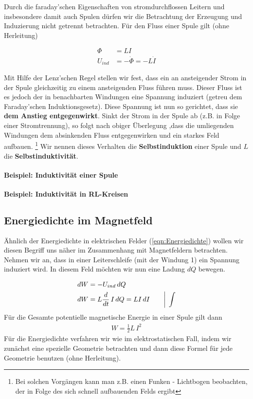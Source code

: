 Durch die faraday'schen Eigenschaften von stromdurchflossen Leitern und insbesondere damit auch Spulen dürfen wir die Betrachtung der Erzeugung und Induzierung nicht getrennt betrachten. 
Für den Fluss einer Spule gilt (ohne Herleitung) 


\begin{align} \label{eqn:FlussSpule}
\Phi &= L I \\
U_{ind} &= -\dot{\Phi} = - L \dot{I}
\end{align}

Mit Hilfe der Lenz'schen Regel stellen wir fest, dass ein an ansteigender Strom in der Spule gleichzeitig zu einem ansteigenden Fluss führen muss. 
Dieser Fluss ist es jedoch der in benachbarten Windungen eine Spannung induziert (getreu dem Faraday'schen Induktionsgesetz).
Diese Spannung ist nun so gerichtet, dass sie \textbf{dem Anstieg entgegenwirkt}.
Sinkt der Strom in der Spule ab (z.B. in Folge einer Stromtrennung), so folgt nach obiger Überlegung ,dass die umliegenden Windungen dem absinkenden Fluss entgegenwirken und ein starkes Feld aufbauen. \footnote{Bei solchen Vorgängen kann man z.B. einen Funken - Lichtbogen beobachten, der in Folge des sich schnell aufbauenden Felds ergibt}
Wir nennen dieses Verhalten die \textbf{Selbstinduktion }einer Spule und $L$ die \textbf{Selbstinduktivität}.

\paragraph{Beispiel: Induktivität einer Spule}
\paragraph{Beispiel: Induktivität in RL-Kreisen}

\subsection{Energiedichte im Magnetfeld}
Ähnlich der Energiedichte in elektrischen Felder (\ref{eqn:Energiedichte}) wollen wir diesen Begriff uns näher im Zusammenhang mit Magnetfeldern betrachten. 
Nehmen wir an, dass in einer Leiterschleife (mit der Windung 1) ein Spannung induziert wird. In diesem Feld möchten wir nun eine Ladung $dQ$ bewegen.

\begin{align*}
dW 	&= - U_{ind} \, dQ \\
dW	&= L \frac{d }{dt} \, {I} \, dQ =  L I \, dI \qquad \bigg| \; \int
\end{align*}
Für die Gesamte potentielle magnetische Energie in einer Spule gilt dann
\begin{align} \label{eqn:magnEnergie}
\boxed{W = \frac{1}{2}L\, I^2}
\end{align}
Für die Energiedichte verfahren wir wie im elektrostatischen Fall, indem wir zunächst eine spezielle Geometrie betrachten und dann diese Formel für jede Geometrie benutzen (ohne Herleitung).

